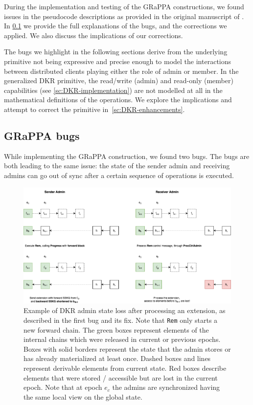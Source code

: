 During the implementation and testing of the GRaPPA constructions,
we found issues in the pseudocode descriptions as provided
in the original manuscript of \cite{GKP}.
In \cref{sc:GRaPPA-bugs} we provide the full explanations of the bugs, 
and the corrections we applied. 
We also discuss the implications of our corrections. 

The bugs we highlight in the following sections
derive from the underlying primitive not being expressive and
precise enough to model the interactions between distributed clients
playing either the role of admin or member.
In the generalized DKR primitive, the read/write (admin) 
and read-only (member) capabilities (see \cref{sc:DKR-implementation})
are not modelled at all in the mathematical definitions of the operations.
We explore the implications and attempt to correct
the primitive in~\cref{sc:DKR-enhancements}.

\subsection{GRaPPA bugs}\label{sc:GRaPPA-bugs}

While implementing the GRaPPA construction, we found two bugs.
The bugs are both leading to the same issue: the state of the
sender admin and receiving admins can go out of sync after a certain
sequence of operations is executed.

\begin{figure}
    \centering
    \includegraphics[width=1\textwidth]{figures/bug1.png}
    \caption{Example of DKR admin state loss after processing an extension, as described in the first bug and its fix. 
    Note that \texttt{Rem} only starts a new forward chain.
    The green boxes represent elements of the internal chains which were released in current or previous epochs. 
    Boxes with solid borders represent the state that the admin stores or has already materialized at least once.
    Dashed boxes and lines represent derivable elements from current state.
    Red boxes describe elements that were stored / accessible but are lost in the current epoch.
    Note that at epoch $e_c$ the admins are synchronized having the same local view on the global state.}
    \label{fig:process-extension-fix}
\end{figure}

